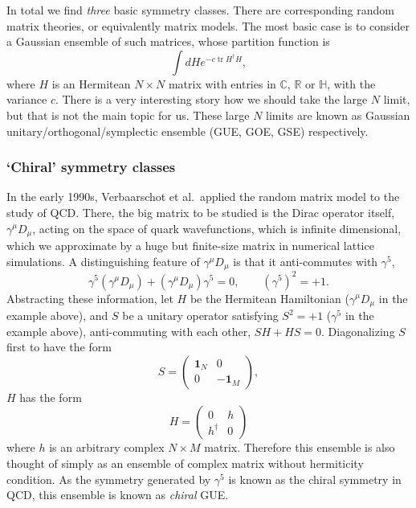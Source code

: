 \documentclass[12pt]{article}
\numberwithin{equation}{section}
\numberwithin{figure}{section}
\theoremstyle{remark}
\def\bC{\mathbb{C}}
\def\bH{\mathbb{H}}
\def\bR{\mathbb{R}}
\def\tr{\mathop{\mathrm{tr}}\nolimits}
\begin{document}
In total we find \emph{three} basic symmetry classes.
There are corresponding random matrix theories, or equivalently matrix models.
The most basic case is to consider a Gaussian ensemble of such matrices,
whose partition function is\begin{equation}
\int dH e^{- c \tr H^\dagger H},
\end{equation} 
where $H$ is an Hermitean $N\times N$ matrix with entries in $\bC$, $\bR$ or $\bH$,
with the variance $c$.
There is a very interesting story how we should take the large $N$ limit, but that is not the main topic for us.
These large $N$ limits are known as Gaussian unitary/orthogonal/symplectic ensemble 
(GUE, GOE, GSE) respectively.


\subsubsection{`Chiral' symmetry classes}

In the early 1990s, Verbaarschot et al.~applied the random matrix model
to the study of QCD. 
There, the big matrix to be studied is the Dirac operator itself, $\gamma^\mu D_\mu$,
acting on the space of quark wavefunctions, which is infinite dimensional,
which we approximate by a huge but finite-size matrix in numerical lattice simulations. 
A distinguishing feature of $\gamma^\mu D_\mu$ is that it anti-commutes with $\gamma^5$, \begin{equation}
\gamma^5 (\gamma^\mu D_\mu) + (\gamma^\mu D_\mu)\gamma^5=0, \qquad (\gamma^5)^2=+1.
\end{equation}
Abstracting these information, 
let $H$ be the Hermitean Hamiltonian ($\gamma^\mu D_\mu$ in the example above),
and $S$ be a unitary operator satisfying $S^2=+1$ ($\gamma^5$ in the example above),
anti-commuting with each other, $SH+HS=0$. 
Diagonalizing $S$ first to have the form \begin{equation}
S=\begin{pmatrix}
\mathbf{1}_N & 0\\
0 & -\mathbf{1}_M
\end{pmatrix},
\end{equation} $H$ has the form \begin{equation}
H=\begin{pmatrix}
0 & h \\
h^\dagger & 0
\end{pmatrix}
\end{equation} where $h$ is an arbitrary complex $N\times M$ matrix.
Therefore this ensemble is also thought of simply as  an ensemble of
complex matrix without hermiticity condition.
As the symmetry generated by $\gamma^5$ is known as the chiral symmetry in QCD,
this ensemble is known as \emph{chiral} GUE.
\end{document}
